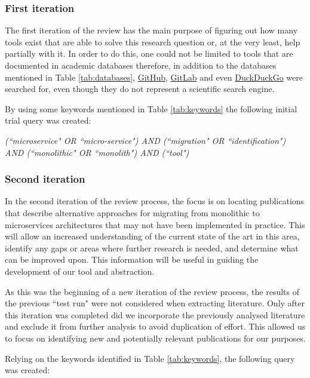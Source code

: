 \documentclass[conference]{IEEEtran}
\begin{document}
\subsubsection*{First iteration} \label{subsub:first-iteration}

The first iteration of the review has the main purpose of figuring out how many
tools exist that are able to solve this research question or, at the very
least, help partially with it. In order to do this, one could not be limited to
tools that are documented in academic databases therefore, in addition to the
databases mentioned in Table \ref{tab:databases},
\href{https://github.com}{GitHub}, \href{https://gitlab.com}{GitLab} and even
\href{https://duckduckgo.org}{DuckDuckGo} were searched for, even though they
do not represent a scientific search engine.

By using some keywords mentioned in Table \ref{tab:keywords} the following
initial trial query was created:

\begin{center}
  \emph{(``microservice" OR ``micro-service") AND (``migration" OR
  ``identification") AND (``monolithic" OR ``monolith") AND (``tool")}
\end{center}

\subsubsection*{Second iteration} \label{subsub:second-iteration}

In the second iteration of the review process, the focus is on locating
publications that describe alternative approaches for migrating from monolithic
to microservices architectures that may not have been implemented in practice.
This will allow an increased understanding of the current state of the art in
this area, identify any gaps or areas where further research is needed, and
determine what can be improved upon. This information will be useful in guiding
the development of our tool and abstraction.

As this was the beginning of a new iteration of the review process, the results
of the previous ``test run" were not considered when extracting literature.
Only after this iteration was completed did we incorporate the previously
analysed literature and exclude it from further analysis to avoid duplication
of effort. This allowed us to focus on identifying new and potentially relevant
publications for our purposes.

Relying on the keywords identified in Table \ref{tab:keywords}, the following
query was created:
\end{document}
